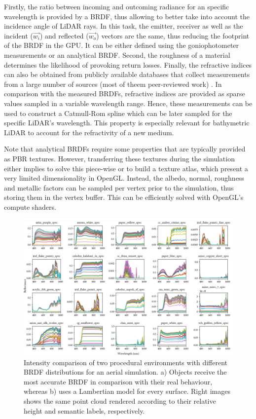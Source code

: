 Firstly, the ratio between incoming and outcoming radiance for an specific wavelength is provided by a BRDF, thus allowing to better take into account the incidence angle of LiDAR rays. In this task, the emitter, receiver as well as the incident ($\vec{w_{i}}$) and reflected ($\vec{w_{o}}$) vectors are the same, thus reducing the footprint of the BRDF in the GPU. It can be either defined using the goniophotometer measurements or an analytical BRDF. Second, the roughness of a material determines the likelihood of provoking return losses. Finally, the refractive indices can also be obtained from publicly available databases that collect measurements from a large number of sources (most of theem peer-reviewed work) \cite{mikhail_n_polyanskiy_refractive_nodate}. In comparison with the measured BRDFs, refractive indices are provided as sparse values sampled in a variable wavelength range. Hence, these measurements can be used to construct a Catmull-Rom spline which can be later sampled for the specific LiDAR's wavelength. This property is especially relevant for bathymetric LiDAR to account for the refractivity of a new medium.

Note that analytical BRDFs require some properties that are typically provided as PBR textures. However, transferring these textures during the simulation either implies to solve this piece-wise or to build a texture atlas, which present a very limited dimensionality in OpenGL. Instead, the albedo, normal, roughness and metallic factors can be sampled per vertex prior to the simulation, thus storing them in the vertex buffer. This can be efficiently solved with OpenGL's compute shaders.

\begin{figure}[hbt]
	\centering
	\includegraphics[width=\linewidth]{figs/lidar_intensity/brdf_database_examples.png}
	\caption{Intensity comparison of two procedural environments with different BRDF distributions for an aerial simulation. a) Objects receive the most accurate BRDF in comparison with their real behaviour, whereas b) uses a Lambertian model for every surface. Right images shows the same point cloud rendered according to their relative height and semantic labels, respectively.}
	\label{fig:brdf_merl_examples}
\end{figure}

